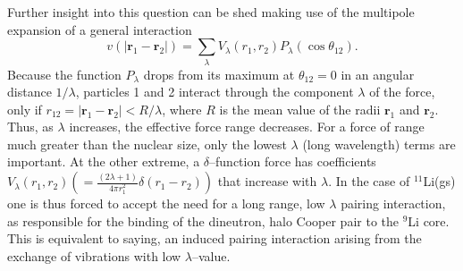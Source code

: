  Further insight into this question can be shed making use of the multipole expansion of a general interaction
\begin{equation}
v(|\mathbf{r}_1-\mathbf r_2|)=\sum_{\lambda}V_{\lambda}(r_1,r_2)P_\lambda(\cos\theta_{12}).
\end{equation}
Because the function $P_\lambda$ drops from its maximum at $\theta_{12}=0$ in an angular distance $1/\lambda$, particles 1 and 2 interact through the component $\lambda$ of the force, only if $r_{12}=|\mathbf{r}_1-\mathbf{r}_2|<R/\lambda$, where $R$ is the mean value of the radii $\mathbf{r}_1$ and $\mathbf{r}_2$. Thus, as $\lambda$ increases, the effective force range decreases. For a force of range much greater than the nuclear size, only the lowest $\lambda$ (long wavelength) terms are important. At the other extreme, a $\delta$--function force has coefficients $V_\lambda(r_1,r_2)\left(=\tfrac{(2\lambda+1)}{4\pi r_1^2}\delta(r_1-r_2)\right)$ that increase with $\lambda$. In the case of $^{11}$Li(gs) one is thus forced to accept the need for a long range, low $\lambda$ pairing interaction, as responsible for the binding of the dineutron, halo Cooper pair to the $^9$Li core. This is equivalent to saying, an induced pairing interaction arising from the exchange of vibrations with low $\lambda$--value.
